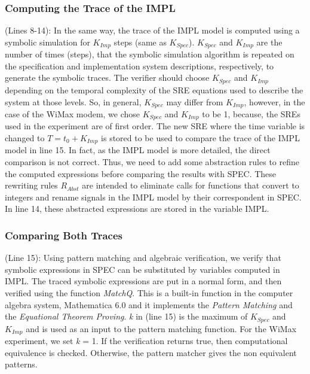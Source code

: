 \documentclass[submission,copyright,creativecommons]{eptcs}
\begin{document}
\subsubsection{Computing the Trace of the IMPL}

(Lines 8-14): In the same way, the trace of the IMPL model is computed using a symbolic simulation for \(K_{Imp}\) steps (same as \(K_{Spec}\)). \(K_{Spec}\) and \(K_{Imp}\) are the number of times (steps), that the symbolic simulation algorithm is repeated on the specification and implementation system descriptions, respectively, to generate the symbolic traces. The verifier should choose \(K_{Spec}\) and \(K_{Imp}\) depending on the temporal complexity of the SRE equations used to describe the system at those levels. So, in general, \(K_{Spec}\) may differ from \(K_{Imp}\), however, in the case of the WiMax modem, we chose \(K_{Spec}\) and \(K_{Imp}\) to be 1, because, the SREs used in the experiment are of first order. The new SRE where the time variable is changed to \(T = t_{0}+K_{Imp}\) is stored to be used to compare the trace of the IMPL model in line 15. In fact, as the IMPL model is more detailed, the direct comparison is not correct. Thus, we need to add some abstraction rules to refine the computed expressions before comparing the results with SPEC. These rewriting rules \(R_{Abst}\) are intended to eliminate calls for functions that convert to integers and rename signals in the IMPL model by their correspondent in SPEC. In line 14, these abstracted expressions are stored in the variable IMPL.

\subsubsection{Comparing Both Traces}

(Line 15): Using pattern matching and algebraic verification, we verify that symbolic expressions in SPEC can be substituted by variables computed in IMPL. The traced symbolic expressions are put in a normal form, and then verified using the function \emph{MatchQ}. This is a built-in function in the computer algebra system, Mathematica 6.0 \cite{6} and it implements the \emph{Pattern Matching} and the \emph{Equational Theorem Proving}. \emph{k} in (line 15) is the maximum of \(K_{Spec}\) and \(K_{Imp}\) and is used as an input to the pattern matching function. For the WiMax experiment, we set \emph{k} = 1. If the verification returns true, then computational equivalence is checked. Otherwise, the pattern matcher gives the non equivalent patterns.
\end{document}

